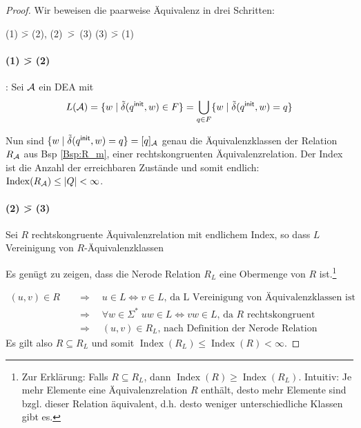 \begin{proof}
  Wir beweisen die paarweise Äquivalenz in drei Schritten:

  \begin{center}
    (1) \=> (2), \quad \mbox{(2) \=> (3)}\quad {} \quad (3) \=> (1)
  \end{center}

        \paragraph{(1) \=> (2)}: Sei $\mathcal{A}$ ein \ac{DEA} mit
  \begin{displaymath}
    L(\mathcal{A})=\{w \mid \tilde\delta({q^\mathsf{init}},w)\in F \} = \bigcup_{q \in F} \{ w \mid \tilde\delta({q^\mathsf{init}},w) = q\}
\end{displaymath}

Nun sind $\{ w \mid \tilde\delta({q^\mathsf{init}},w)=q \} = [q]_{\mathcal{A}}$ genau die Äquivalenzklassen der Relation $R_{\mathcal{A}}$ aus Bsp \ref{Bsp:R_m}, einer rechtskongruenten Äquivalenzrelation.
Der Index ist die Anzahl der erreichbaren Zustände und somit endlich: $\operatorname{\operatorname{Index}}(R_{\mathcal{A}}) \le |Q| < \infty$.
        
\paragraph{(2) \=> (3)} Sei $R$ rechtskongruente Äquivalenzrelation mit endlichem Index, so dass $L$ Vereinigung von $R$-Äquivalenzklassen
        
Es genügt zu zeigen, dass die Nerode Relation $R_L$ eine Obermenge von $R$ ist.\footnote{
Zur Erklärung: Falls $R \subseteq R_L$, dann $\operatorname{Index}(R) \ge \operatorname{Index}(R_L)$.
Intuitiv: Je mehr Elemente eine Äquivalenzrelation $R$ enthält, desto mehr Elemente sind bzgl. dieser Relation äquivalent, d.h. desto weniger unterschiedliche Klassen gibt es.
}

\begin{align*}
(u, v) \in R & \quad\Rightarrow\quad u \in L \Leftrightarrow v \in L \text{, \ \ \  da L Vereinigung von Äquivalenzklassen ist} \\
& \quad\Rightarrow\quad \forall w \in \Sigma^*\; uw \in L \Leftrightarrow vw \in L \text{, \ \ \ da $R$ rechtskongruent } \\
& \quad\Rightarrow\quad (u, v) \in R_L \text{, \ \ \  nach Definition der Nerode Relation}
\end{align*}
Es gilt also $R \subseteq R_L$ und somit $\operatorname{Index}(R_L) \leq \operatorname{Index}(R)<\infty$.



\end{proof}

